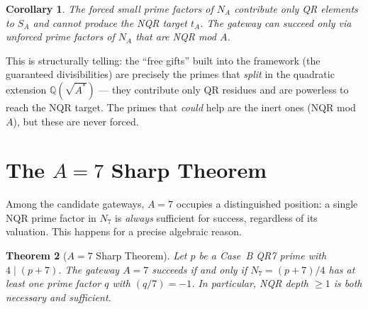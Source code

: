 \documentclass[12pt]{amsart}
\newtheorem{theorem}{Theorem}[section]
\newtheorem{corollary}[theorem]{Corollary}
\theoremstyle{definition}
\theoremstyle{remark}
\begin{document}
\begin{corollary}\label{cor:forced-inert}
The forced small prime factors of $N_A$ contribute only QR elements
to $S_A$ and cannot produce the NQR target $t_A$.
The gateway can succeed only via \emph{unforced} prime factors of $N_A$
that are NQR mod $A$.
\end{corollary}

This is structurally telling: the ``free gifts'' built into the framework
(the guaranteed divisibilities) are precisely the primes that \emph{split}
in the quadratic extension $\mathbb{Q}(\sqrt{A^*})$ ---
they contribute only QR residues and are powerless to reach the NQR target.
The primes that \emph{could} help are the inert ones (NQR mod~$A$),
but these are never forced.

\section{The $A=7$ Sharp Theorem}\label{sec:a7sharp}

Among the candidate gateways, $A = 7$ occupies a distinguished position:
a single NQR prime factor in $N_7$ is \emph{always} sufficient for success,
regardless of its valuation.
This happens for a precise algebraic reason.

\begin{theorem}[$A=7$ Sharp Theorem]\label{thm:a7sharp}
Let $p$ be a Case~B QR7 prime with $4 \mid (p+7)$.
The gateway $A = 7$ succeeds if and only if
$N_7 = (p+7)/4$ has at least one prime factor $q$ with $(q/7) = -1$.
In particular, NQR depth $\ge 1$ is both necessary and sufficient.
\end{theorem}
\end{document}
